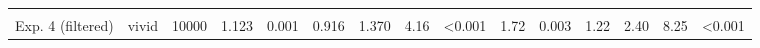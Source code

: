 \documentclass[
]{article}
\begin{document}
\begin{table}[!h]
{\begin{tabular}[t]{llrrrrrrlrrrrrl}
\hspace{1em}\cellcolor{gray!10}{Exp. 4 (filtered)} & \cellcolor{gray!10}{neutral} & \cellcolor{gray!10}{10000} & \cellcolor{gray!10}{0.828} & \cellcolor{gray!10}{0.001} & \cellcolor{gray!10}{0.703} & \cellcolor{gray!10}{0.983} & \cellcolor{gray!10}{} & \cellcolor{gray!10}{} & \cellcolor{gray!10}{1.16} & \cellcolor{gray!10}{0.001} & \cellcolor{gray!10}{1.02} & \cellcolor{gray!10}{1.28} & \cellcolor{gray!10}{} & \cellcolor{gray!10}{}\\
\hspace{1em}Exp. 4 (filtered) & vivid & 10000 & 1.123 & 0.001 & 0.916 & 1.370 & 4.16 & <0.001 & 1.72 & 0.003 & 1.22 & 2.40 & 8.25 & <0.001\\
\bottomrule
\end{tabular}}
\end{table}
\end{document}
